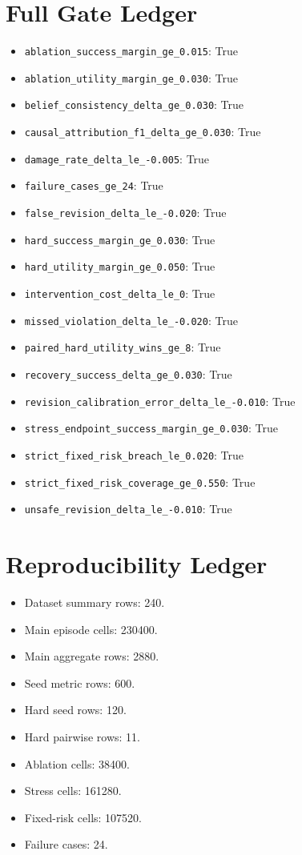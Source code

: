 \documentclass{article}
\begin{document}
\section{Full Gate Ledger}
\begin{table}[t]
\centering
\small
\resizebox{\linewidth}{!}{}
\caption{Predefined local gates.}
\end{table}
\begin{itemize}
\item \texttt{ablation\_success\_margin\_ge\_0.015}: True
\item \texttt{ablation\_utility\_margin\_ge\_0.030}: True
\item \texttt{belief\_consistency\_delta\_ge\_0.030}: True
\item \texttt{causal\_attribution\_f1\_delta\_ge\_0.030}: True
\item \texttt{damage\_rate\_delta\_le\_-0.005}: True
\item \texttt{failure\_cases\_ge\_24}: True
\item \texttt{false\_revision\_delta\_le\_-0.020}: True
\item \texttt{hard\_success\_margin\_ge\_0.030}: True
\item \texttt{hard\_utility\_margin\_ge\_0.050}: True
\item \texttt{intervention\_cost\_delta\_le\_0}: True
\item \texttt{missed\_violation\_delta\_le\_-0.020}: True
\item \texttt{paired\_hard\_utility\_wins\_ge\_8}: True
\item \texttt{recovery\_success\_delta\_ge\_0.030}: True
\item \texttt{revision\_calibration\_error\_delta\_le\_-0.010}: True
\item \texttt{stress\_endpoint\_success\_margin\_ge\_0.030}: True
\item \texttt{strict\_fixed\_risk\_breach\_le\_0.020}: True
\item \texttt{strict\_fixed\_risk\_coverage\_ge\_0.550}: True
\item \texttt{unsafe\_revision\_delta\_le\_-0.010}: True
\end{itemize}

\clearpage
\section{Reproducibility Ledger}
\begin{itemize}
\item Dataset summary rows: 240.
\item Main episode cells: 230400.
\item Main aggregate rows: 2880.
\item Seed metric rows: 600.
\item Hard seed rows: 120.
\item Hard pairwise rows: 11.
\item Ablation cells: 38400.
\item Stress cells: 161280.
\item Fixed-risk cells: 107520.
\item Failure cases: 24.
\end{itemize}
\end{document}
